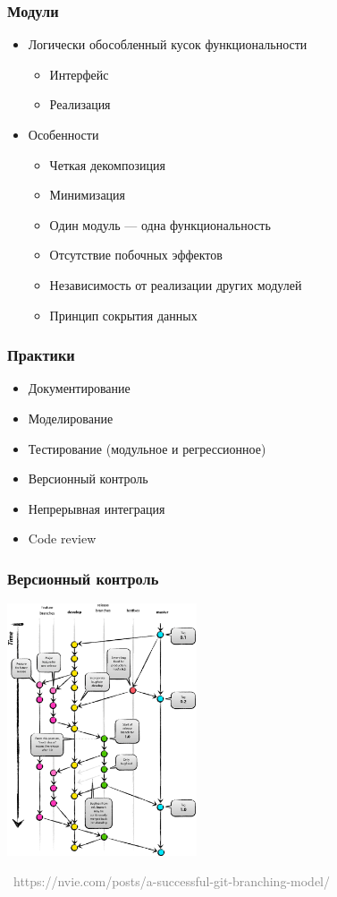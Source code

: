 \documentclass[xetex,mathserif,serif]{beamer}
\newcommand{\attribution}[1] {
	\vspace{-5mm}\begin{flushright}\begin{scriptsize}\textcolor{gray}{\textcopyright\, #1}\end{scriptsize}\end{flushright}
}
\begin{document}
	\begin{frame}
		\frametitle{Модули}
		\begin{itemize}
			\item Логически обособленный кусок функциональности
			\begin{itemize}
				\item Интерфейс
				\item Реализация
			\end{itemize}
			\item Особенности
			\begin{itemize}
				\item Четкая декомпозиция
				\item Минимизация
				\item Один модуль --- одна функциональность
				\item Отсутствие побочных эффектов
				\item Независимость от реализации других модулей
				\item Принцип сокрытия данных
			\end{itemize}
		\end{itemize}
	\end{frame}

	\begin{frame}
		\frametitle{Практики}
		\begin{itemize}
			\item Документирование
			\item Моделирование
			\item Тестирование (модульное и регрессионное)
			\item Версионный контроль
			\item Непрерывная интеграция
			\item Code review
		\end{itemize}
	\end{frame}

	\begin{frame}
		\frametitle{Версионный контроль}
		\begin{center}
			\includegraphics[width=0.42\textwidth]{git-flow.png}
			\attribution{https://nvie.com/posts/a-successful-git-branching-model/}
		\end{center}
	\end{frame}
\end{document}
